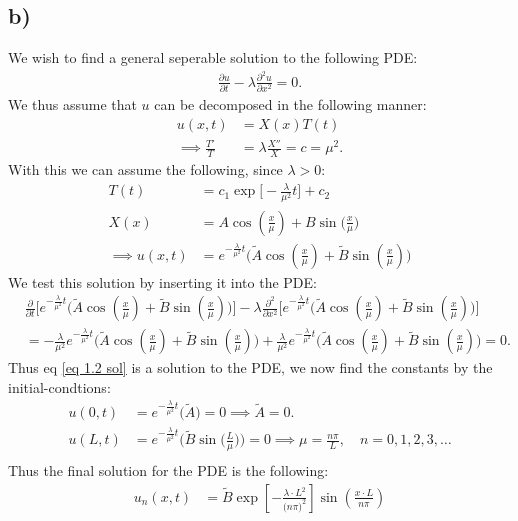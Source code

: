 \documentclass{article}
\begin{document}
\subsection*{b)}
We wish to find a general seperable solution to the following PDE:
\begin{align*}
    \frac{\partial u}{\partial t} - \lambda \frac{\partial^2 u}{\partial x^2} = 0.
\end{align*}We thus assume that $u$ can be decomposed in the following manner:
\begin{align*}
    u(x,t) &= X(x)T(t)\\
    \implies \frac{T'}{T}& = \lambda\frac{X''}{X} = c = \mu^2.
\end{align*}With this we can assume the following, since $\lambda > 0$:
\begin{align}
    T(t) &= c_1\exp\big[-\frac{\lambda}{\mu^2}t\big] + c_2\nonumber\\
    X(x) &= A\cos(\frac{x}{\mu}) + B\sin\big(\frac{x}{\mu}\big)\nonumber\\
    \implies u(x,t) &= e^{-\frac{\lambda}{\mu^2} t}\Big(\tilde{A}\cos(\frac{x}{\mu}) + \tilde{B}\sin(\frac{x}{\mu})\Big)\label{eq 1.2 sol}
\end{align}We test this solution by inserting it into the PDE:
\begin{align*}
   &\frac{\partial}{\partial t} \Bigg[e^{-\frac{\lambda}{\mu^2} t}\Big(\tilde{A}\cos(\frac{x}{\mu}) + \tilde{B}\sin(\frac{x}{\mu})\Big)\Bigg] - \lambda \frac{\partial^2}{\partial x^2}\Bigg[e^{-\frac{\lambda}{\mu^2} t}\Big(\tilde{A}\cos(\frac{x}{\mu}) + \tilde{B}\sin(\frac{x}{\mu})\Big)\Bigg]\\
   &=-\frac{\lambda}{\mu^2} e^{-\frac{\lambda}{\mu^2} t}\Big(\tilde{A}\cos(\frac{x}{\mu}) + \tilde{B}\sin(\frac{x}{\mu})\Big) + \frac{\lambda}{\mu^2} e^{-\frac{\lambda}{\mu^2} t}\Big(\tilde{A}\cos(\frac{x}{\mu}) + \tilde{B}\sin(\frac{x}{\mu})\Big) = 0.
\end{align*}Thus eq \eqref{eq 1.2 sol} is a solution to the PDE, we now find the constants by the initial-condtions:
\begin{align*}
    u(0, t) &= e^{-\frac{\lambda}{\mu^2} t}\Big(\tilde{A}\Big) = 0\implies \tilde{A} = 0.\\
    u(L, t) &= e^{-\frac{\lambda}{\mu^2} t}\Big(\tilde{B}\sin\big(\frac{L}{\mu}\big)\Big) = 0\implies \mu = \frac{n\pi}{L}, \quad n = 0,1,2,3,\dots\\ 
\end{align*}Thus the final solution for the PDE is the following:
\begin{align*}
    u_n(x,t) &= \tilde{B}\exp\left[-\frac{\lambda\cdot L^2}{\Big(n\pi\Big)^2}\right]\sin\left(\frac{x\cdot L}{n\pi}\right)
\end{align*}
\end{document}
